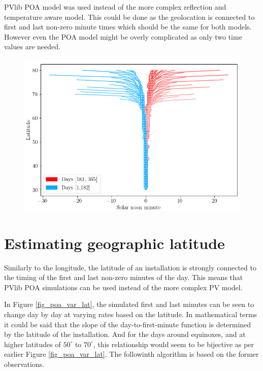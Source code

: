 PVlib POA model was used instead of the more complex reflection and temperature aware model. This could be done as the geolocation is connected to first and last non-zero minute times which should be the same for both models. However even the POA model might be overly complicated as only two time values are needed.




\begin{figure}[]
\centering
\includegraphics[width=1\linewidth]{pics/solarnoontimes2}
\label{fig_solarnoontimes}
\end{figure}








\newpage 
\section{Estimating geographic latitude}
Similarly to the longitude, the latitude of an installation is strongly connected to the timing of the first and last non-zero minutes of the day. This means that PVlib POA simulations can be used instead of the more complex PV model.

In Figure \ref{fig_poa_var_lat}, the simulated first and last minutes can be seen to change day by day at varying rates based on the latitude. In mathematical terms it could be said that the slope of the day-to-first-minute function is determined by the latitude of the installation. And for the days around equinoxes, and at higher latitudes of $50^\circ$ to $70^\circ$, this relationship would seem to be bijective as per earlier Figure \ref{fig_poa_var_lat}. The followinth algorithm is based on the former observations.


